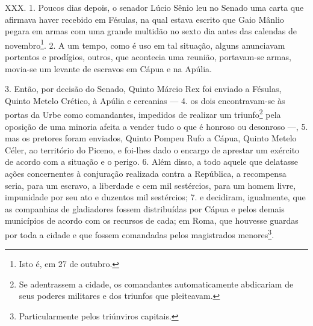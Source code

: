 XXX. 1. Poucos dias depois, o senador Lúcio Sênio leu no Senado uma carta que
afirmava haver recebido em Fésulas, na qual estava escrito que Gaio Mânlio
pegara em armas com uma grande multidão no sexto dia antes das calendas de
novembro\footnote{Isto é, em 27 de outubro.}. 2. A um tempo, como é uso em tal
situação, alguns anunciavam portentos e prodígios, outros, que acontecia uma
reunião, portavam-se armas, movia-se um levante de escravos em Cápua e na
Apúlia.

3. Então, por decisão do Senado, Quinto Márcio Rex foi enviado a Fésulas,
Quinto Metelo Crético, à Apúlia e cercanias --- 4. os dois encontravam-se às
portas da Urbe como comandantes, impedidos de realizar um triunfo\footnote{Se
adentrassem a cidade, os comandantes automaticamente abdicariam de seus poderes
militares e dos triunfos que pleiteavam.} pela oposição de uma minoria afeita a
vender tudo o que é honroso ou desonroso ---, 5. mas os pretores foram
enviados, Quinto Pompeu Rufo a Cápua, Quinto Metelo Céler, ao território do Piceno,
e foi-lhes dado o encargo de aprestar um exército de acordo com a situação e o
perigo. 6. Além disso, a todo aquele que delatasse ações concernentes à
conjuração realizada contra a República, a recompensa seria, para um escravo, a
liberdade e cem mil sestércios, para um homem livre, impunidade por seu ato e
duzentos mil sestércios; 7. e decidiram, igualmente, que as companhias de
gladiadores fossem distribuídas por Cápua e pelos demais municípios de acordo
com os recursos de cada; em Roma, que houvesse guardas por toda a cidade e que
fossem comandadas pelos magistrados menores\footnote{Particularmente pelos
triúnviros capitais.}.

